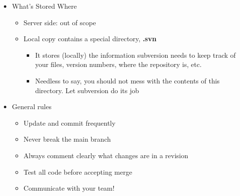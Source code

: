 \begin{itemize}
		\item What’s Stored Where
		\begin{itemize}
			\item Server side: out of scope
			\item Local copy contains a special directory, \textbf{.svn}
			\begin{itemize}
				\item It stores (locally) the information subversion needs to keep track of your files, version numbers, where the repository is, etc.
				\item Needless to say, you should not mess with the contents of this directory. Let subversion do its job
			\end{itemize}
		\end{itemize}

		\item General rules
		\begin{itemize}
			\item Update and commit frequently
			\item Never break the main branch
			\item Always comment clearly what changes are in a revision
			\item Test all code before accepting merge
			\item Communicate with your team!
		\end{itemize}
	\end{itemize}
%